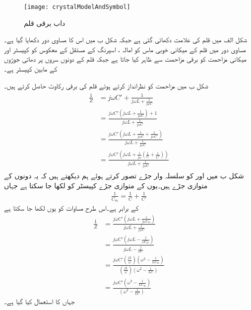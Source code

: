 \begin{figure}
\centering
\texttt{[image: crystalModelAndSymbol]}
\caption{داب برقی قلم}
\label{شکل_مرتعش_داب_برقی_قلم}
\end{figure}
%
شکل  الف میں قلم کی علامت دکھائی گئی ہے جبکہ شکل  ب میں اس کا مساوی دور دکھایا گیا ہے۔مساوی دور میں قلم کے میکانی خوبی ماس  کو امالہ ، اسپرنگ کے مستقل  کے معکوس کو کپیسٹر  اور میکانی مزاحمت کو برقی مزاحمت  سے  ظاہر کیا جاتا ہے جبکہ  قلم کے دونوں سروں پر دھاتی جوڑوں کے مابین کپیسٹر ہے۔

شکل  ب میں مزاحمت  کو نظرانداز کرتے ہوئے قلم کی برقی رکاوٹ حاصل کرتے ہیں۔
\begin{gather}
\begin{aligned} \label{مساوات_مرتعش_کرسٹل_رکاوٹ_حصول}
\frac{1}{Z}&=j \omega C'+\frac{1}{j \omega L +\frac{1}{j \omega C}}\\
&=\frac{j \omega C' \left( j \omega L +\frac{1}{j \omega C} \right)+1}{j \omega L +\frac{1}{j \omega C}}\\
&=\frac{j \omega C'  \left( j \omega L +\frac{1}{j \omega C} +\frac{1}{j\omega C'}\right)}{j \omega L +\frac{1}{j \omega C}}\\
&=\frac{j \omega C'  \left( j \omega L +\frac{1}{j \omega} \left( \frac{1}{C}+\frac{1}{C'}\right)\right)}{j \omega L +\frac{1}{j \omega C}}
\end{aligned}
\end{gather}
شکل  ب میں   اور  کو سلسلہ وار جڑے تصور کرتے ہوئے ہم دیکھتے ہیں کہ یہ دونوں  کے متوازی جڑے ہیں۔یوں  کے متوازی  جڑے کپیسٹر کو  لکھا جا سکتا ہے جہاں
\begin{align*}
\frac{1}{C_m}=\frac{1}{C}+\frac{1}{C'}
\end{align*}
کے برابر ہے۔اس طرح مساوات  کو یوں لکھا جا سکتا ہے
\begin{align*}
\frac{1}{Z}&=\frac{j \omega C'  \left( j \omega L +\frac{1}{j \omega C_m} \right)}{j \omega L +\frac{1}{j \omega C}}\\
&=\frac{j \omega C'  \left( j \omega L -\frac{j}{\omega C_m} \right)}{j \omega L -\frac{j}{ \omega C}}\\
&=\frac{j \omega C'  \left(\frac{j L}{\omega} \right)\left(\omega^2 -\frac{1}{LC_m} \right)}{ \left(\frac{j L}{\omega} \right) \left(\omega^2 -\frac{1}{LC} \right)}\\
&=\frac{j \omega C'  \left(\omega^2 -\frac{1}{LC_m} \right)}{\left(\omega^2 -\frac{1}{LC} \right)}
\end{align*}
جہاں   کا استعمال کیا گیا ہے۔

